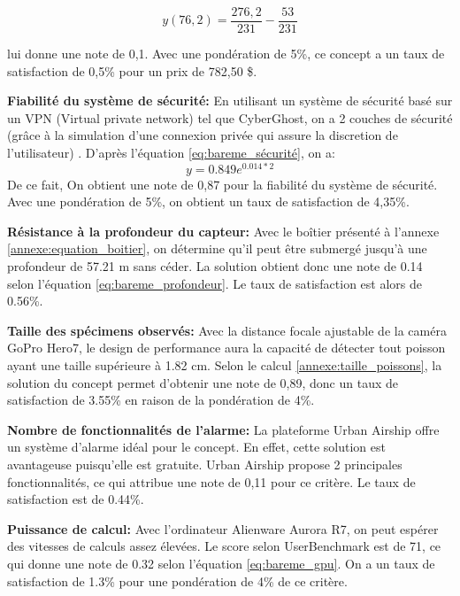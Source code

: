 \begin{equation}
    y(76,2) = 
        \frac{276,2}{231} - \frac{53}{231}
\end{equation}

lui donne une note de 0,1. Avec une pondération de 5\%, ce concept a un taux de satisfaction de 0,5\% pour un prix de 782,50 \$.
\vspace{5mm}


\textbf{Fiabilité du système de sécurité:}
En utilisant un système de sécurité basé sur un VPN (Virtual private network) tel que CyberGhost, on a 2 couches de sécurité (grâce à la simulation d’une connexion privée qui assure la discretion de l'utilisateur) . D'après l'équation \ref{eq:bareme_sécurité}, on a:
\begin{equation}
    y = 0.849 e^{0.014*2}
\end{equation}
De ce fait, On obtient une note de 0,87 pour la fiabilité du système de sécurité. Avec une pondération de 5\%, on obtient un taux de satisfaction de 4,35\%.
\vspace{5mm}


\textbf{Résistance à la profondeur du capteur:} Avec le boîtier présenté à l'annexe \ref{annexe:equation_boitier}, on détermine qu'il peut être submergé jusqu'à une profondeur de 57.21 m sans céder. La solution obtient donc une note de 0.14 selon l'équation \ref{eq:bareme_profondeur}. Le taux de satisfaction est alors de 0.56\%.
\vspace{5mm}


\textbf{Taille des spécimens observés:} Avec la distance focale ajustable de la caméra GoPro Hero7, le design de performance aura la capacité de détecter tout poisson ayant une taille supérieure à 1.82 cm. Selon le calcul 
\ref{annexe:taille_poissons}, la solution du concept permet d'obtenir une note de 0,89, donc un taux de satisfaction de 3.55\% en raison de la pondération de 4\%.
\vspace{5mm}


\textbf{Nombre de fonctionnalités de l'alarme:}
La plateforme Urban Airship offre un système d'alarme idéal pour le concept. En effet, cette solution est avantageuse puisqu'elle est gratuite. Urban Airship propose 2 principales fonctionnalités, ce qui attribue une note de 0,11 pour ce critère. Le taux de satisfaction est de 0.44\%.
\vspace{5mm}

\textbf{Puissance de calcul:} Avec l'ordinateur Alienware Aurora R7, on peut espérer des vitesses de calculs assez élevées. Le score selon UserBenchmark est de 71, ce qui donne une note de 0.32 selon l'équation \ref{eq:bareme_gpu}. On a un taux de satisfaction de 1.3\% pour une pondération de 4\% de ce critère.
\vspace{5mm}


